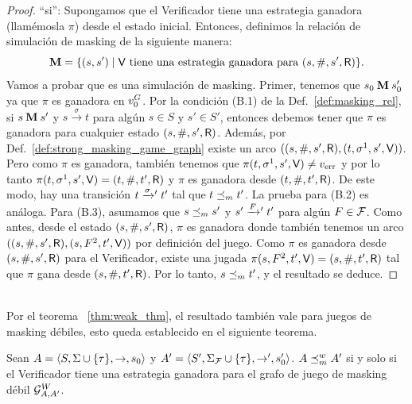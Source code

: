 \begin{proof}
``si'': Supongamos que el Verificador tiene una estrategia ganadora (llamémosla $\pi$) 
desde el estado inicial. Entonces, definimos la relación de simulación de masking de la siguiente manera: 
\[
\mathbin{\mathbf{M}} = \{(s,s') \mid \mathsf{V} \text{ tiene una estrategia ganadora para } (s, \#, s', \mathsf{R}) \}.
\]
Vamos a probar que es una simulación de masking. 
Primer, tenemos que $s_0 \mathbin{\mathbf{M}} s'_0$ ya que $\pi$ es ganadora en $v_0^G$. Por la condición (B.1) de la Def.~\ref{def:masking_rel}, si
$s \mathbin{\mathbf{M}} s'$ y $s \xrightarrow{\sigma} t$ para algún $s \in S$ y $s' \in S'$, entonces debemos tener que $\pi$ es ganadora para cualquier estado $(s,\#,s',\mathsf{R})$. Además, por Def.~\ref{def:strong_masking_game_graph} existe un arco 
$((s,\#,s',\mathsf{R}), (t,\sigma^1,s',\mathsf{V}))$. 
Pero como $\pi$ es ganadora, también tenemos que $\pi(t,\sigma^1,s',\mathsf{V}) \neq v_{\text{err}}$ y 
por lo tanto $\pi(t,\sigma^1,s',\mathsf{V})=(t, \#, t', \mathsf{R})$ y $\pi$ es ganadora desde  $(t, \#, t', \mathsf{R})$.
De este modo, hay una transición $t \mathrel{{\xrightarrow[]{\sigma}}{}'} t'$ tal que
$t \preceq_{m} t'$. La prueba para (B.2) es análoga. Para (B.3), asumamos que $s \preceq_{m} s'$ y $s' \mathrel{{\xrightarrow[]{F}}{}'} t'$ para algún 
$F \in \mathcal{F}$. 
Como antes, desde el estado $(s,\#,s',\mathsf{R})$, $\pi$ es ganadora donde también tenemos un arco $((s,\#,s',\mathsf{R}), (s,F^2,t',\mathsf{V}))$ por definición del juego. 
Como $\pi$ es ganadora desde $(s,\#,s',\mathsf{R})$ para el Verificador, existe una jugada $\pi(s,F^2,t',\mathsf{V}) = (s,\#,t',\mathsf{R})$ tal que $\pi$ gana desde 
$(s,\#,t',\mathsf{R})$. Por lo tanto, $s \preceq_{m} t'$, y el resultado se deduce.
\qedhere

\end{proof} \\

Por el teorema ~\ref{thm:weak_thm}, el resultado también vale para juegos de masking débiles, esto queda establecido en el siguiente teorema.

\begin{theorem} \label{thm:weak_wingame_strat}
  Sean $A=\langle S, \Sigma \cup \{\tau\}, \rightarrow, s_0 \rangle$ y
  $A'=\langle S', \Sigma_{\mathcal{F}} \cup \{\tau\}, \rightarrow', s'_0 \rangle$.
  $A \preceq^w_{m} A'$ si y solo si el Verificador tiene una estrategia ganadora para el grafo de juego de masking débil $\mathcal{G}^W_{A,A'}$.
\end{theorem}

